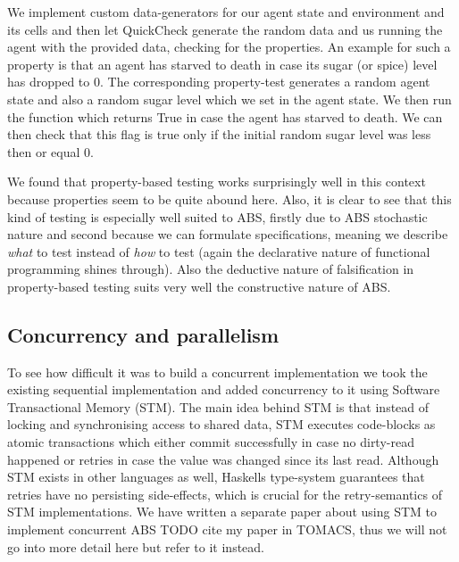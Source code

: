 We implement custom data-generators for our agent state and environment and its cells and then let QuickCheck generate the random data and us running the agent with the provided data, checking for the properties. An example for such a property is that an agent has starved to death in case its sugar (or spice) level has dropped to 0. The corresponding property-test generates a random agent state and also a random sugar level which we set in the agent state. We then run the function which returns True in case the agent has starved to death. We can then check that this flag is true only if the initial random sugar level was less then or equal 0.

We found that property-based testing works surprisingly well in this context because properties seem to be quite abound here. Also, it is clear to see that this kind of testing is especially well suited to ABS, firstly due to ABS stochastic nature and second because we can formulate specifications, meaning we describe \textit{what} to test instead of \textit{how} to test (again the declarative nature of functional programming shines through). Also the deductive nature of falsification in property-based testing suits very well the constructive nature of ABS.

\subsection{Concurrency and parallelism}
To see how difficult it was to build a concurrent implementation we took the existing sequential implementation and added concurrency to it using Software Transactional Memory (STM). The main idea behind STM is that instead of locking and synchronising access to shared data, STM executes code-blocks as atomic transactions which either commit successfully in case no dirty-read happened or retries in case the value was changed since its last read. Although STM exists in other languages as well, Haskells type-system guarantees that retries have no persisting side-effects, which is crucial for the retry-semantics of STM implementations. We have written a separate paper about using STM to implement concurrent ABS TODO cite my paper in TOMACS, thus we will not go into more detail here but refer to it instead. 